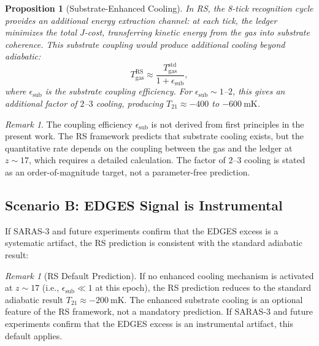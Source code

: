 \documentclass[12pt,a4paper]{article}
\newtheorem{proposition}[theorem]{Proposition}
\theoremstyle{definition}
\theoremstyle{remark}
\newtheorem{remark}[theorem]{Remark}
\begin{document}
\begin{proposition}[Substrate-Enhanced Cooling]
\label{prop:cooling}
In RS, the 8-tick recognition cycle provides an additional energy
extraction channel: at each tick, the ledger minimizes the total
$J$-cost, transferring kinetic energy from the gas into substrate
coherence.  This substrate coupling would produce additional cooling
beyond adiabatic:
\begin{equation}
  T_{\mathrm{gas}}^{\mathrm{RS}} \approx \frac{T_{\mathrm{gas}}^{\mathrm{std}}}
  {1 + \epsilon_{\mathrm{sub}}},
\end{equation}
where $\epsilon_{\mathrm{sub}}$ is the substrate coupling efficiency.
For $\epsilon_{\mathrm{sub}} \sim 1$--$2$, this gives an additional
factor of $2$--$3$ cooling, producing $T_{21} \approx -400$ to
$-600~\mathrm{mK}$.
\end{proposition}

\begin{remark}
The coupling efficiency $\epsilon_{\mathrm{sub}}$ is not derived from
first principles in the present work.  The RS framework predicts that
substrate cooling exists, but the quantitative rate depends on the
coupling between the gas and the ledger at $z \sim 17$, which
requires a detailed calculation.  The factor of $2$--$3$ cooling is
stated as an order-of-magnitude target, not a parameter-free prediction.
\end{remark}

\subsection{Scenario B: EDGES Signal is Instrumental}

If SARAS-3 and future experiments confirm that the EDGES excess is
a systematic artifact, the RS prediction is consistent with the
standard adiabatic result:

\begin{remark}[RS Default Prediction]
\label{rem:standard}
If no enhanced cooling mechanism is activated at $z \sim 17$
(i.e., $\epsilon_{\mathrm{sub}} \ll 1$ at this epoch), the RS
prediction reduces to the standard adiabatic result
$T_{21} \approx -200~\mathrm{mK}$.  The enhanced substrate cooling
is an optional feature of the RS framework, not a mandatory
prediction.  If SARAS-3 and future experiments confirm that the
EDGES excess is an instrumental artifact, this default applies.
\end{remark}

\end{document}
